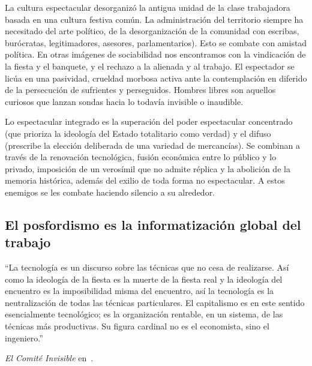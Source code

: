 La cultura espectacular desorganizó la antigua unidad de la clase trabajadora basada en una cultura festiva común. La administración del territorio siempre ha necesitado del arte político, de la desorganización de la comunidad con escribas, burócratas, legitimadores, asesores, parlamentarios). Esto se combate con amistad política. En otras imágenes de sociabilidad nos encontramos con la vindicación de la fiesta y el banquete, y el rechazo a la  alienada y al trabajo. El espectador se licúa en una pasividad, crueldad morbosa activa ante la contemplación en diferido de la persecución de sufrientes y perseguidos. Hombres libres son aquellos curiosos que lanzan sondas hacia lo todavía invisible o inaudible.

Lo espectacular integrado es la superación del poder espectacular concentrado (que prioriza la ideología del Estado totalitario como verdad) y el difuso (prescribe la elección deliberada de una variedad de mercancías). Se combinan a través de la renovación tecnológica, fusión económica entre lo público y lo privado, imposición de un verosímil que no admite réplica y la abolición de la memoria histórica, además del exilio de toda forma no espectacular. A estos enemigos se les combate haciendo silencio a su alrededor.

\subsection{El posfordismo es la informatización global del trabajo}
\label{sub:el-posfordismo-es-la-informatización-global-del-trabajo}

\epigraph{\enquote{La tecnología es un discurso sobre las técnicas que no cesa de realizarse. Así como la ideología de la fiesta es la muerte de la fiesta real y la ideología del encuentro es la imposibilidad misma del encuentro, así la tecnología es la neutralización de todas las técnicas particulares. El capitalismo es en este sentido esencialmente tecnológico; es la organización rentable, en un sistema, de las técnicas más productivas. Su figura cardinal no es el economista, sino el ingeniero.}}{\emph{El Comité Invisible} en~\autocite[p.~131]{comiteinvisibleNuestrosAmigos2015}.}

